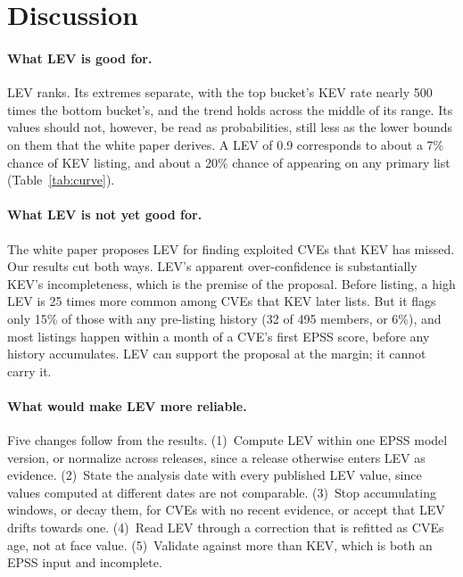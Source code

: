 \section{Discussion}\label{sec:discussion}

\paragraph{What LEV is good for.} LEV ranks. Its extremes separate, with the
top bucket's KEV rate nearly 500 times the bottom bucket's, and the trend holds
across the middle of its range. Its values should not, however, be read as
probabilities, still less as the lower bounds on them that the white paper
derives. A LEV of 0.9 corresponds to about a 7\% chance of KEV listing,
and about a 20\% chance of appearing on any primary list
(Table~\ref{tab:curve}).

\paragraph{What LEV is not yet good for.} The white paper proposes LEV for
finding exploited CVEs that KEV has missed. Our results cut both ways. LEV's
apparent over-confidence is substantially KEV's incompleteness, which is the
premise of the proposal. Before listing, a high LEV is 25 times more common
among CVEs that KEV later lists. But it flags only 15\% of those with any
pre-listing history (32 of 495 members, or 6\%), and most listings happen within a month of a CVE's first EPSS score, before any history
accumulates. LEV can support the proposal at the margin; it cannot carry it.

\paragraph{What would make LEV more reliable.} Five changes follow from the
results.
(1)~Compute LEV within one EPSS model version, or normalize across releases,
since a release otherwise enters LEV as evidence.
(2)~State the analysis date with every published LEV value, since values
computed at different dates are not comparable.
(3)~Stop accumulating windows, or decay them, for CVEs with no recent evidence,
or accept that LEV drifts towards one.
(4)~Read LEV through a correction that is refitted as CVEs age, not at face
value.
(5)~Validate against more than KEV, which is both an EPSS input and incomplete.

